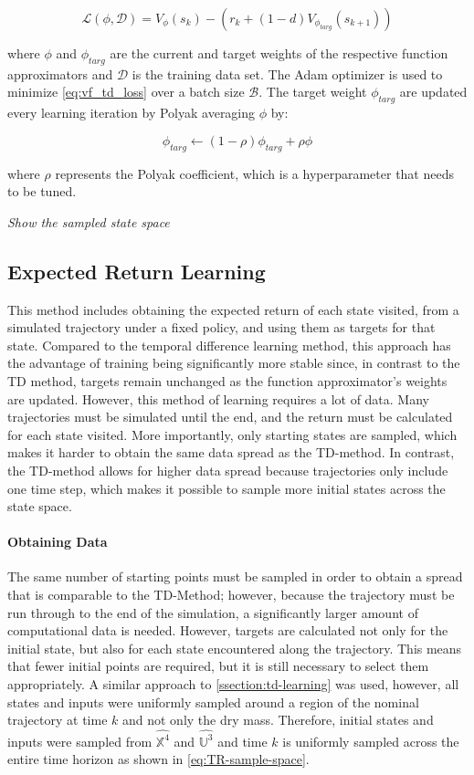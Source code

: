 \begin{equation}\label{eq:vf_td_loss}
    \mathcal{L}(\phi, \mathcal{D}) =  V_{\phi}(s_k) - (r_k + (1-d) V_{\phi_{targ}} (s_{k+1}))
\end{equation}

where $\phi$ and $\phi_{targ}$ are the current and target weights of the respective function approximators and $\mathcal{D}$ is the training data set. The Adam optimizer is used to minimize \autoref{eq:vf_td_loss} over a batch size $\mathcal{B}$. The target weight $\phi_{targ}$ are updated every learning iteration by Polyak averaging $\phi$ by:

\begin{equation}
    \phi_{targ} \leftarrow (1 - \rho) \phi_{targ} + \rho \phi
\end{equation}

where $\rho$ represents the Polyak coefficient, which is a hyperparameter that needs to be tuned.


\emph{Show the sampled state space}

\subsection{Expected Return Learning}
This method includes obtaining the expected return of each state visited, from a simulated trajectory under a fixed policy, and using them as targets for that state. Compared to the temporal difference learning method, this approach has the advantage of training being significantly more stable since, in contrast to the TD method, targets remain unchanged as the function approximator's weights are updated. However, this method of learning requires a lot of data. Many trajectories must be simulated until the end, and the return must be calculated for each state visited. More importantly, only starting states are sampled, which makes it harder to obtain the same data spread as the TD-method. In contrast, the TD-method allows for higher data spread because trajectories only include one time step, which makes it possible to sample more initial states across the state space. 

\paragraph{Obtaining Data}
The same number of starting points must be sampled in order to obtain a spread that is comparable to the TD-Method; however, because the trajectory must be run through to the end of the simulation, a significantly larger amount of computational data is needed. However, targets are calculated not only for the initial state, but also for each state encountered along the trajectory. This means that fewer initial points are required, but it is still necessary to select them appropriately. A similar approach to \autoref{ssection:td-learning} was used, however, all states and inputs were uniformly sampled around a region of the nominal trajectory at time $k$ and not only the dry mass. Therefore, initial states and inputs were sampled from $\hat{\mathbb{X}^4}$ and $\hat{\mathbb{U}^3}$ and time $k$ is uniformly sampled across the entire time horizon as shown in \autoref{eq:TR-sample-space}.

